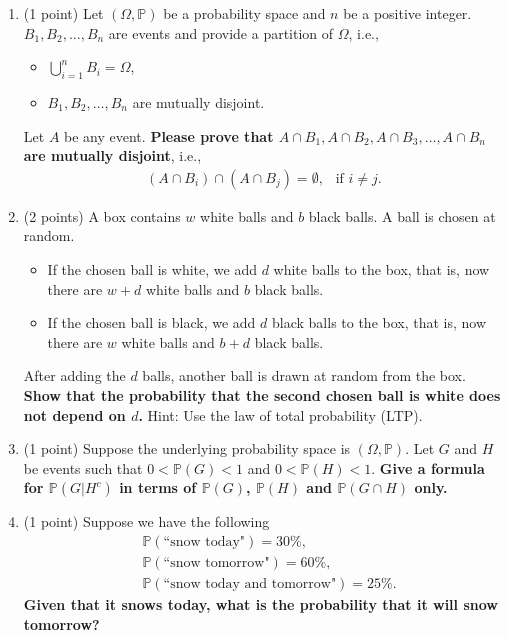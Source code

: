 \documentclass[11pt]{article}
\begin{document}
\begin{enumerate}
\item (1 point) Let $(\Omega,\mathbb{P})$ be a probability space and $n$ be a positive integer. $B_1, B_2,\ldots, B_n$ are events and provide a partition of $\Omega$, i.e.,
\begin{itemize}
    \item $\bigcup_{i=1}^n B_i=\Omega$,
    \item $B_1, B_2,\ldots, B_n$ are mutually disjoint.
\end{itemize}
Let $A$ be any event. \textbf{Please prove that $A\cap B_1, A\cap B_2, A\cap B_3,\ldots, A\cap B_n$ are mutually disjoint}, i.e.,
\begin{align*}
    (A\cap B_i)\cap (A\cap B_j)=\emptyset,\ \ \text{ if }i\ne j.
\end{align*}


\item (2 points) A box contains $w$ white balls and $b$ black balls.  A ball is chosen at random. 
\begin{itemize}
\item If the chosen ball is white, we add $d$ white balls to the box, that is, now there are $w+d$ white balls and $b$ black balls.
\item If the chosen ball is black, we add $d$ black balls to the box, that is, now there are $w$ white balls and $b+d$ black balls. 
\end{itemize}
After adding the $d$ balls, another ball is drawn at random from the box.  \textbf{Show that the probability that the second chosen ball is white does not depend on $d$.} Hint: Use the law of total probability (LTP).


\item (1 point) Suppose the underlying probability space is $(\Omega,\mathbb{P})$. Let $G$ and $H$ be events such that $0<\mathbb{P}(G)<1$ and $0<\mathbb{P}(H)<1$. \textbf{Give a formula for $\mathbb{P}(G|H^c)$ in terms of $\mathbb{P}(G)$, $\mathbb{P}(H)$ and $\mathbb{P}(G\cap H)$ only.}


\item (1 point) Suppose we have the following
\begin{align*}
    & \mathbb{P}(\text{``snow today"})=30\%, \\
    & \mathbb{P}(\text{``snow tomorrow"})=60\%, \\
    & \mathbb{P}(\text{``snow today and tomorrow"})=25\%.
\end{align*}
\textbf{Given that it snows today, what is the probability that it will snow tomorrow?}



\end{enumerate}
\end{document}
